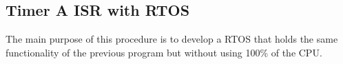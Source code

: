 \subsection{Timer A ISR with RTOS}

The main purpose of this procedure is to develop a RTOS that holds the same functionality of the previous program but without using 100\% of the CPU.